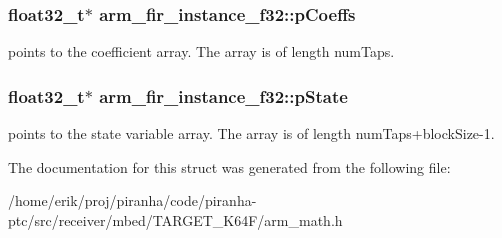 \subsubsection[{\texorpdfstring{p\+Coeffs}{pCoeffs}}]{\setlength{\rightskip}{0pt plus 5cm}float32\+\_\+t$\ast$ arm\+\_\+fir\+\_\+instance\+\_\+f32\+::p\+Coeffs}\hypertarget{structarm__fir__instance__f32_a1c9cfca901d5902afeb640f2831488f4}{}\label{structarm__fir__instance__f32_a1c9cfca901d5902afeb640f2831488f4}
points to the coefficient array. The array is of length num\+Taps. 
\subsubsection[{\texorpdfstring{p\+State}{pState}}]{\setlength{\rightskip}{0pt plus 5cm}float32\+\_\+t$\ast$ arm\+\_\+fir\+\_\+instance\+\_\+f32\+::p\+State}\hypertarget{structarm__fir__instance__f32_a7afcf4022e8560db9b8fd28b0d090a15}{}\label{structarm__fir__instance__f32_a7afcf4022e8560db9b8fd28b0d090a15}
points to the state variable array. The array is of length num\+Taps+block\+Size-\/1. 

The documentation for this struct was generated from the following file\+:\begin{DoxyCompactItemize}
\item 
/home/erik/proj/piranha/code/piranha-\/ptc/src/receiver/mbed/\+T\+A\+R\+G\+E\+T\+\_\+\+K64\+F/arm\+\_\+math.\+h\end{DoxyCompactItemize}
